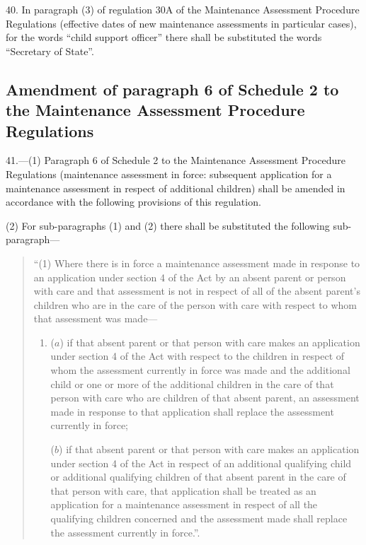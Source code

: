 \documentclass[12pt,a4paper]{article}
\begin{document}
40.  In paragraph (3) of regulation 30A of the Maintenance Assessment Procedure Regulations (effective dates of new maintenance assessments in particular cases), for the words “child support officer” there shall be substituted the words “Secretary of State”.

\subsection[41. Amendment of paragraph 6 of Schedule 2 to the Maintenance Assessment Procedure Regulations]{Amendment of paragraph 6 of Schedule 2 to the Maintenance Assessment Procedure Regulations}

41.—(1) Paragraph 6 of Schedule 2 to the Maintenance Assessment Procedure Regulations (maintenance assessment in force: subsequent application for a maintenance assessment in respect of additional children) shall be amended in accordance with the following provisions of this regulation.

(2) For sub-paragraphs (1) and (2) there shall be substituted the following sub-paragraph—
\begin{quotation}
“(1) Where there is in force a maintenance assessment made in response to an application under section 4 of the Act by an absent parent or person with care and that assessment is not in respect of all of the absent parent’s children who are in the care of the person with care with respect to whom that assessment was made—
\begin{enumerate}\item[]
($a$) if that absent parent or that person with care makes an application under section 4 of the Act with respect to the children in respect of whom the assessment currently in force was made and the additional child or one or more of the additional children in the care of that person with care who are children of that absent parent, an assessment made in response to that application shall replace the assessment currently in force;

($b$) if that absent parent or that person with care makes an application under section 4 of the Act in respect of an additional qualifying child or additional qualifying children of that absent parent in the care of that person with care, that application shall be treated as an application for a maintenance assessment in respect of all the qualifying children concerned and the assessment made shall replace the assessment currently in force.”.
\end{enumerate}
\end{quotation}
\end{document}
